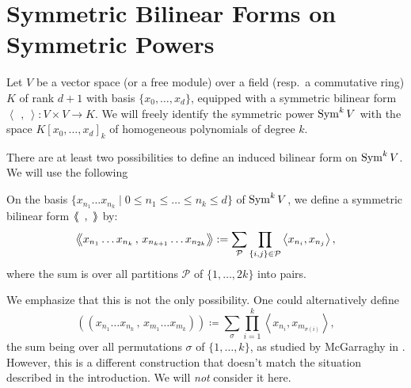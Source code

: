 \section{Symmetric Bilinear Forms on Symmetric Powers} \label{symSection}
Let $V$ be a vector space (or a free module) over a field (resp.~a commutative ring) $K$ of rank $d+1$ with basis $\{x_0,\ldots,x_{d}\}$, equipped with a symmetric bilinear form $\left<\,\ ,\ \right>: V\times V \rightarrow K$. We will freely identify the symmetric power $\operatorname{Sym}^kV$ with the space $K[x_0,\ldots,x_d]_k$ of homogeneous polynomials of degree $k$. 

There are at least two possibilities to define an induced bilinear form on $\operatorname{Sym}^kV$. We will use the following
\begin{definition} \label{formdef} On the basis $\{x_{n_1}\ldots x_{n_k}\;|\;0\leq n_1\leq\ldots\leq n_k\leq d\}$ of $\operatorname{Sym}^kV$, we define a symmetric bilinear form $\left<\!\!\!\:\left<\ \,,\ \right>\!\!\!\:\right>$ by: 
\begin{equation}
\label{mydef}
\left<\!\!\!\:\left< x_{n_1}\ldots x_{n_k}\,,\,x_{n_{k+1}}\ldots x_{n_{2k}} \right>\!\!\!\:\right> := \sum_{\mathcal{P}} \prod_{\{i,j\}\in\mathcal{P}} \left<x_{n_i},x_{n_j}\right>,
\end{equation}
where the sum is over all partitions $\mathcal{P}$ of $\{1,\ldots,2k\}$ into pairs.
\end{definition}

We emphasize that this is not the only possibility. One could alternatively define
\begin{equation}\label{Garr}
\left(\!\left( x_{n_1}\ldots x_{n_k}\,,\, x_{m_1}\ldots x_{m_k}\right)\!\right) \coloneqq \sum_\sigma  
\prod_{i=1}^k \left< x_{n_i},x_{m_{\sigma(i)}}\right>,
\end{equation}
the sum being over all permutations $\sigma$ of $\{1,\ldots,k\}$, as studied by McGarraghy in \cite{McGarr}. However, this is a different construction that doesn't match the situation described in the introduction. We will \emph{not} consider it here.

